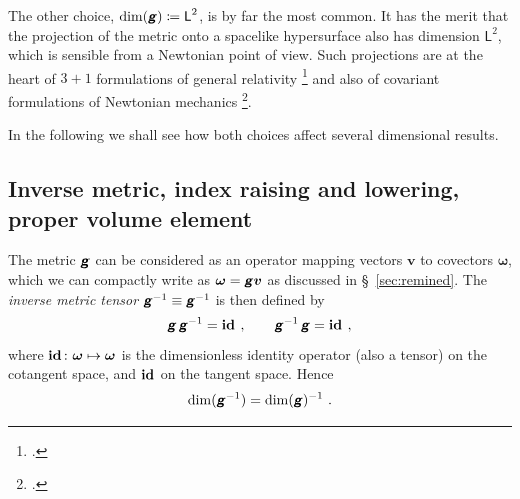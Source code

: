 \documentclass[\ifafour a4paper,12pt,\else a5paper,10pt,\fi%
onecolumn,oneside,article,%
british%
]{memoir}
\makeatletter
\theoremstyle{remark}
\theoremstyle{innote}
\newcommand*{\mathte}[1]{\textbf{\textit{\textsf{#1}}}}
\newcommand*{\citep}{\footcites}
\newcommand*{\defd}{\coloneqq}
\renewcommand*{\|}[1][]{\nonscript\,#1\vert\nonscript\;\mathopen{}}
\newcommand*{\sect}{\S}%
\newcommand*{\sects}{\S\S}%
\newcommand*{\chap}{ch.}%
\newcommand*{\q}{}%
\DeclareRobustCommand*{\q}{%
  \mathord{\mathpalette\bigcdot@{}}%
}
\newcommand*{\bigcdot@scalefactor}{0.7}
\newcommand*{\bigcdot@widthfactor}{1.5}
\newcommand*{\bigcdot@}[2]{%
  \sbox0{$#1\vcenter{}$}%
  \sbox2{$#1\cdot\m@th$}%
  \hbox to \bigcdot@widthfactor\wd2{%
    \hfil
    \raise\ht0\hbox{%
      \scalebox{\bigcdot@scalefactor}{%
        \lower\ht0\hbox{$#1\bullet\m@th$}%
      }%
    }%
    \hfil
  }%
}
\newcommand*{\Un}{\textsf{1}}
\newcommand*{\Le}{\textsf{L}}
\newcommand*{\Ti}{\textsf{T}}
\newcommand*{\yg}{\mathte{g}}
\newcommand*{\yom}{\bm{\omega}}
\newcommand*{\yv}{\bm{v}}
\renewcommand*{\i}{\indices}
\newcommand*{\id}{\mathbf{id}}%
\makeatother
\begin{document}
The other choice, $\dim(\yg) \defd \Le^{2}$, is by far the most common. It
has the merit that the projection of the metric onto a spacelike
hypersurface also has dimension $\Le^{2}$, which is sensible from a
Newtonian point of view. Such projections are at the heart of $3+1$
formulations of general relativity \citep(I thank I.~Bengtsson for this
remark){gourgoulhon2007_r2012,alcubierre2008}[\chap~21]{misneretal1970_r1973}{wilsonetal2003_r2007,smarretal1978,york1979,smarretal1980}
and also of covariant formulations of Newtonian mechanics
\citep[\sects~B.II.152--154, D.II.203--205, D.V.238,
F.IV.285--289]{truesdelletal1960}[\sect~2.4]{marsdenetal1983b_r1994}.

In the following we shall see how both choices affect several dimensional
results. %

\subsection{Inverse metric, index raising and lowering, proper volume element}
\label{sec:g_inv_vol}

The metric $\yg$ can be considered as an operator mapping vectors $\yv$ to
covectors $\yom$, which we can compactly write as $\yom=\yg\yv$ as
discussed in \sect~\ref{sec:remined}. The \emph{inverse metric tensor}
$\yg^{-1} \equiv \yg\i{^{-1}^{\q\q}}$ is then defined by
\begin{equation}
  \label{eq:inverse_g}
  \yg\,\yg^{-1} = \id\i{_{\q}^{\q}} \ ,
  \qquad
  \yg^{-1}\,\yg = \id\i{^{\q}_{\q}} \ ,
\end{equation}
where $\id\i{_{\q}^{\q}}\colon \yom \mapsto \yom$ is the dimensionless
identity operator (also a tensor) on the cotangent space, and
$\id\i{^{\q}_{\q}}$ on the tangent space. Hence
\begin{equation}
  \label{eq:dim_ig}
  \dim(\yg^{-1}) = \dim(\yg)^{-1} \ .
\end{equation}
\end{document}
